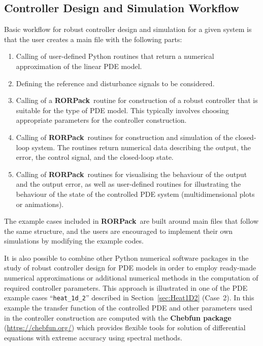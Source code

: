 \documentclass[11pt, a4paper]{amsart}
\theoremstyle{definition}
\numberwithin{equation}{section}
\newcommand{\RORname}{\textbf{RORPack}}
\begin{document}
\subsection{Controller Design and Simulation Workflow}

Basic workflow for robust controller design and simulation for a given system is that the user creates a main file with the following parts:
\begin{enumerate}
  \item Calling of user-defined Python routines that return a numerical approximation of the linear PDE model.
  \item Defining the reference and disturbance signals to be considered.
  \item Calling of a \RORname\ routine for construction of a robust controller that is suitable for the type of PDE model.
    This typically involves choosing appropriate parameters for the controller construction.
  \item Calling of \RORname\ routines for construction and simulation of the closed-loop system. The routines return numerical data describing the output, the error, the control signal, and the closed-loop state.
  \item Calling of \RORname\ routines for visualising the behaviour of the output and the output error, as well as 
    user-defined routines for illustrating the behaviour of the state of the controlled PDE system (multidimensional plots or animations).
\end{enumerate}
The example cases included in \RORname\ are built around main files that follow the same structure, and the users are encouraged to implement their own simulations by modifying the example codes.

It is also possible to combine other Python numerical software packages in the study of robust controller design for PDE models in order to employ ready-made numerical approximations or additional numerical methods in the computation of required controller parameters. This approach is illustrated in one of the PDE example cases ``\texttt{heat\_1d\_2}'' described in Section~\ref{sec:Heat1D2} (Case~2). 
In this example the transfer function of the controlled PDE and other parameters used in the controller construction are computed with the \textbf{Chebfun package}~\cite{DriHal14book,Tre13book} (\href{https://chebfun.org/}{https://chebfun.org/}) which provides flexible tools for solution of differential equations with extreme accuracy using spectral methods. 
\end{document}
